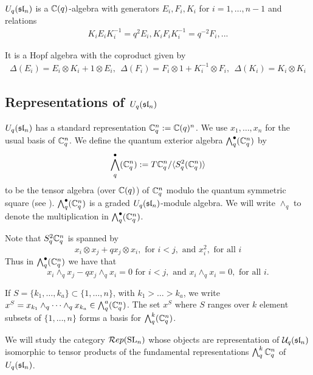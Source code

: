 \documentclass[10pt,leqno]{article}
\begin{document}
$U_q(\sl_n) $ is a $ \bC(q)$-algebra with generators $ E_i, F_i, K_i $ for $ i = 1, \dots, n-1 $ and relations
\begin{align*}
K_i E_i K_i^{-1} = q^2 E_i, K_i F_i K_i^{-1} = q^{-2}F_i, ...
\end{align*}


It is a Hopf algebra with the coproduct given by
\begin{align*}
\Delta(E_i) = E_i \otimes K_i + 1 \otimes E_i, \ \ \Delta(F_i) = F_i \otimes 1 + K_i^{-1} \otimes F_i, \ \ \Delta(K_i) = K_i \otimes K_i 
\end{align*}

\subsection{Representations of $U_q(\sl_n) $}

$U_q(\sl_n) $ has a standard representation $ \bC_q^n := \bC(q)^n $.  We use $ x_1, \dots, x_n $ for the usual basis of $ \bC_q^n $.  We define the quantum exterior algebra $\Alt^\bullet_q(\bC_q^n) $ by
$$
\Alt^\bullet_q(\bC_q^n) := T \bC_q^n / \langle S^2_q ( \bC_q^n) \rangle
$$
to be the tensor algebra (over $\bC(q) $) of $ \bC_q^n $ modulo the quantum symmetric square (see \cite{BZ}).  $ \Alt^\bullet_q(\bC_q^n) $ is a graded $U_q(\sl_n)$-module algebra. We will write $ \wedge_q $ to denote the multiplication in $ \Alt^\bullet_q(\bC_q^n) $.

Note that $S^2_q \bC_q^n $ is spanned by 
$$
x_i \otimes x_j + q x_j \otimes x_i, \text{ for }  i < j , \text{ and } x_i^2, \text{ for all } i 
$$ 
Thus in $ \Alt^\bullet_q(\bC_q^n) $ we have that
$$
x_i \wedge_q x_j - q x_j \wedge_q x_i = 0 \text{ for }  i < j, \text{ and } x_i \wedge_q x_i = 0, \text{ for all }  i . 
$$

If $ S =\{k_1, \dots, k_a\} \subset \{1, \dots, n\} $, with $ k_1 > \dots > k_a $, we write $ x^S = x_{k_1} \wedge_q \cdots \wedge_q x_{k_a} \in \Alt^a_q(\bC_q^n) $. The set $ x^S $ where $ S $ ranges over $ k $ element subsets of $ \{1, \dots, n \} $ forms a basis for $ \Alt^k_q(\bC_q^n) $.

We will study the category $\Rep(\SL_n)$ whose objects are representation of $\Uq(\sl_n) $ isomorphic to tensor products of the fundamental representations $\Alt^k_q \bC_q^n$ of $U_q(\sl_n)$.
\end{document}
